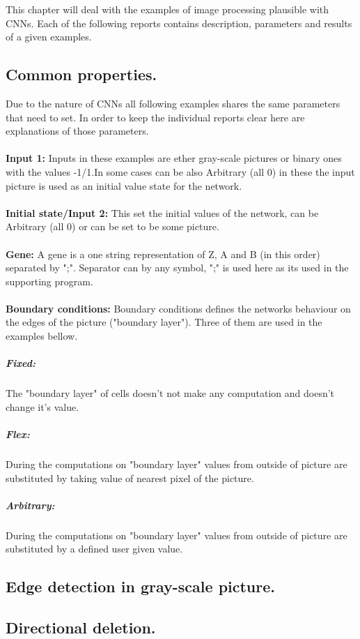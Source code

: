 This chapter will deal with the examples of image processing plausible with CNNs. 
Each of the following reports contains description, parameters and results of a given examples.

\subsection{Common properties.}
Due to the nature of CNNs all following examples shares the same parameters that need to set. In order to keep the individual reports clear here are explanations of those parameters.\\\\
\textbf{Input 1:} Inputs in these examples are ether gray-scale pictures or binary ones with the values -1/1.In some cases can be also Arbitrary (all 0) in these the input picture is used as an initial value state for the network. \\\\
\textbf{Initial state/Input 2:} This set the initial values of the network, can be Arbitrary (all 0) or can be set to be some picture.   \\\\
\textbf{Gene:} A gene is a one string representation of Z, A and B (in this order) separated by ";". Separator can by any symbol, ";" is used here as its used in the supporting program. \\\\
\textbf{Boundary conditions:} Boundary conditions defines the networks behaviour on the edges of the picture ("boundary layer"). Three of them are used in the examples bellow.
\subparagraph{Fixed:} The "boundary layer" of cells doesn't not make any computation and doesn't change it's value.
\subparagraph{Flex:} During the computations on "boundary layer" values from outside of picture are substituted by taking value of nearest pixel of the picture.
\subparagraph{Arbitrary:}During the computations on "boundary layer" values from outside of picture are substituted by a defined user given value. \\



\newpage
\subsection{Edge detection in gray-scale picture.}


\newpage
\subsection{Directional deletion.}


